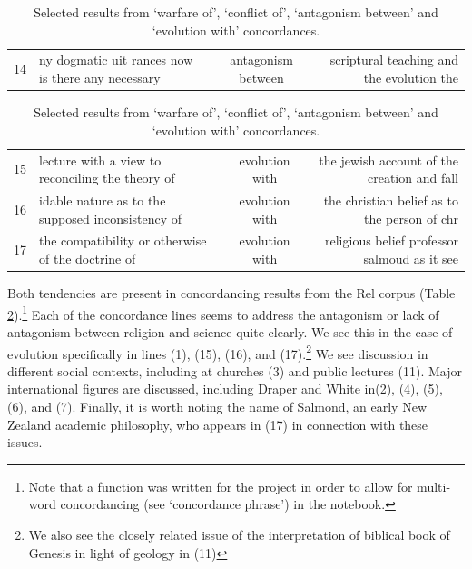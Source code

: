 \documentclass{article}
\begin{document}
\begin{table}[]
\begin{tabular}{l|lcr}
        14  &  ny dogmatic uit rances now is there any necessary  & antagonism between &  scriptural teaching and the evolution the \\
      \end{tabular}
      \begin{tabular}{l|lcr}
        15  & lecture with a view to reconciling the theory of &  evolution with &  the jewish account of the creation and fall  \\
        16  & idable nature as to the supposed inconsistency of  & evolution with  & the christian belief as to the person of chr \\
        17  & the compatibility or otherwise of the doctrine of  & evolution with &  religious belief professor salmoud as it see \\
        \end{tabular}
        \caption{Selected results from `warfare of', `conflict of', `antagonism between' and `evolution with' concordances.}
        \label{t:rel-concordance}
\end{table}

Both tendencies are present in concordancing results from the Rel corpus (Table \ref{t:rel-concordance}).\footnote{Note that a function was written for the project in order to allow for multi-word concordancing (see `concordance phrase') in the notebook.} Each of the concordance lines seems to address the antagonism or lack of antagonism between religion and science quite clearly. We see this in the case of evolution specifically in lines (1), (15), (16), and (17).\footnote{We also see the closely related issue of the interpretation of biblical book of Genesis in light of geology in (11)} We see discussion in different social contexts, including at churches (3) and public lectures (11). Major international figures are discussed, including Draper and White in(2), (4), (5), (6), and (7). Finally, it is worth noting the name of Salmond, an early New Zealand academic philosophy, who appears in (17) in connection with these issues.
\end{document}
